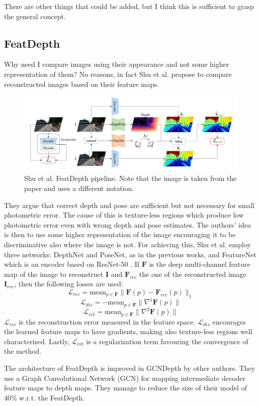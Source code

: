 There are other things that could be added, but I think this is sufficient to grasp the general concept.

\subsection{FeatDepth}
Why need I compare images using their appearance and not some higher representation of them?
No reasons, in fact Shu et al. \cite{FeatDepth} propose to compare reconstructed images based on their feature maps.

\begin{figure}
	\centering
	\includegraphics[scale=0.3]{figs/featdepth}
	\caption{Shu et al. FeatDepth \cite{FeatDepth} pipeline. Note that the image is taken from the paper and uses a different notation. \label{fig:featdepth}}
\end{figure}

They argue that correct depth and pose are sufficient but not necessary for small photometric error.
The cause of this is texture-less regions which produce low photometric error even with wrong depth and pose estimates.
The authors' idea is then to use some higher representation of the image encouraging it to be discriminative also where the image is not.
For achieving this, Shu et al. employ three networks: DepthNet and PoseNet, as in the previous works, and FeatureNet which is an encoder based on ResNet-50 \cite{ResNet}.
If $\mathbf{F}$ is the deep multi-channel feature map of the image to reconstruct $\mathbf{I}$ and $\mathbf{F}_{rec}$ the one of the reconstructed image $\mathbf{I}_{rec}$, then the following losses are used:
\[
	\mathcal{L}_{rec} = \text{mean}_{p \in \mathbf{F}} \big\| \mathbf{F}(p) - \mathbf{F}_{rec}(p) \big\|_{1}
\] \[
	\mathcal{L}_{dis} = - \text{mean}_{p \in \mathbf{F}} \big\| \nabla^{1} \mathbf{F}(p) \big\|
\] \[
	\mathcal{L}_{cvt} = \text{mean}_{p \in \mathbf{F}} \big\| \nabla^{2} \mathbf{F}(p) \big\|
\]
$\mathcal{L}_{rec}$ is the reconstruction error measured in the feature space.
$\mathcal{L}_{dis}$ encourages the learned feature maps to have gradients, making also texture-less regions well characterized.
Lastly, $\mathcal{L}_{cvt}$ is a regularization term favouring the convergence of the method.

The architecture of FeatDepth is improved in GCNDepth \cite{GCNDepth} by other authors.
They use a Graph Convolutional Network (GCN) for mapping intermediate decoder feature maps to depth maps.
They manage to reduce the size of their model of 40\% w.r.t. the FeatDepth.